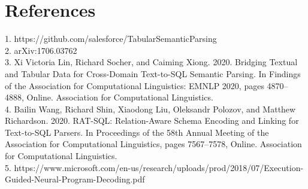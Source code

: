 \documentclass[10pt,a4paper]{article}
\begin{document}
\section{References}
1. https://github.com/salesforce/TabularSemanticParsing \\
2. arXiv:1706.03762 \\
3. Xi Victoria Lin, Richard Socher, and Caiming Xiong. 2020. Bridging Textual and Tabular Data for Cross-Domain Text-to-SQL Semantic Parsing. In Findings of the Association for Computational Linguistics: EMNLP 2020, pages 4870–4888, Online. Association for Computational Linguistics.\\
4. Bailin Wang, Richard Shin, Xiaodong Liu, Oleksandr Polozov, and Matthew Richardson. 2020. RAT-SQL: Relation-Aware Schema Encoding and Linking for Text-to-SQL Parsers. In Proceedings of the 58th Annual Meeting of the Association for Computational Linguistics, pages 7567–7578, Online. Association for Computational Linguistics.\\
5. https://www.microsoft.com/en-us/research/uploads/prod/2018/07/Execution-Guided-Neural-Program-Decoding.pdf
\end{document}

